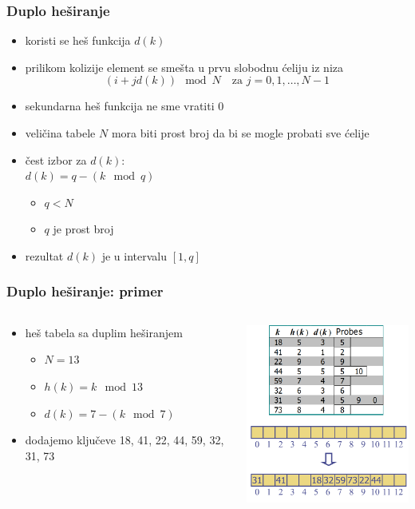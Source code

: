 \documentclass[compress,aspectratio=169]{beamer}
\begin{document}
\begin{frame}[fragile]
  \frametitle{Duplo heširanje}
  \begin{itemize}
    \item koristi se  heš funkcija $d(k)$
    \item prilikom kolizije element se smešta u prvu slobodnu ćeliju iz niza
    $$(i + jd(k))\mod N \quad\text{za}\,\, j = 0, 1, \ldots, N-1$$
    \item sekundarna heš funkcija ne sme vratiti 0
    \item veličina tabele $N$ mora biti prost broj da bi se mogle probati sve ćelije
    \item čest izbor za $d(k)$: \\
    $d(k) = q - (k\mod q)$
    \begin{itemize}
      \item $q < N$
      \item $q$ je prost broj
    \end{itemize}
    \item rezultat $d(k)$ je u intervalu $[1, q]$ 
  \end{itemize}
\end{frame}

\begin{frame}[fragile]
  \frametitle{Duplo heširanje: primer}
  \begin{columns}
    \begin{column}[c]{6cm}
      \begin{itemize}
        \item heš tabela sa duplim heširanjem
        \begin{itemize}
          \item $N = 13$
          \item $h(k) = k \mod 13$
          \item $d(k) = 7 - (k\mod 7)$
        \end{itemize}
        \item dodajemo ključeve 18, 41, 22, 44, 59, 32, 31, 73 
      \end{itemize}
    \end{column}
    \begin{column}[c]{6cm}
      \begin{center}
        \includegraphics[width=6cm]{asp-10-pic10.png}
      \end{center}
    \end{column}
  \end{columns}
\end{frame}
\end{document}
